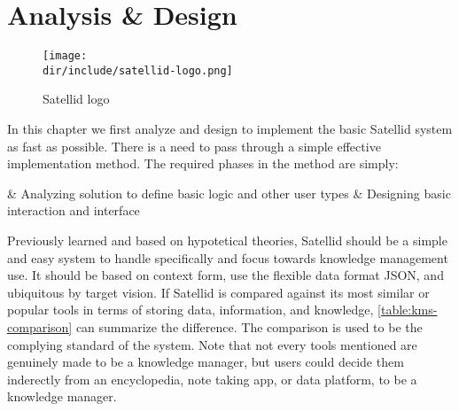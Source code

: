 \chapter{Analysis \& Design}
\label{chap:analysis-design}

\begin{figure}[ht]
  \centering
  \texttt{[image: \\dir/include/satellid-logo.png]}
  \caption{Satellid logo}
  \label{fig:satellid-logo}
\end{figure}

In this chapter we first analyze and design to implement the basic Satellid system as fast as possible.
There is a need to pass through a simple effective implementation method.
The required phases in the method are simply:

\begin{easylist}
& Analyzing solution to define basic logic and other user types
& Designing basic interaction and interface
\end{easylist}

Previously learned and based on hypotetical theories, Satellid should be a simple and easy system to handle specifically and focus towards knowledge management use.
It should be based on context form, use the flexible data format \ac{JSON}, and ubiquitous by target vision.
If Satellid is compared against its most similar or popular tools in terms of storing data, information, and knowledge, \autoref{table:kms-comparison} can summarize the difference.
The comparison is used to be the complying standard of the system.
Note that not every tools mentioned are genuinely made to be a knowledge manager, but users could decide them inderectly from an encyclopedia, note taking app, or data platform, to be a knowledge manager.

